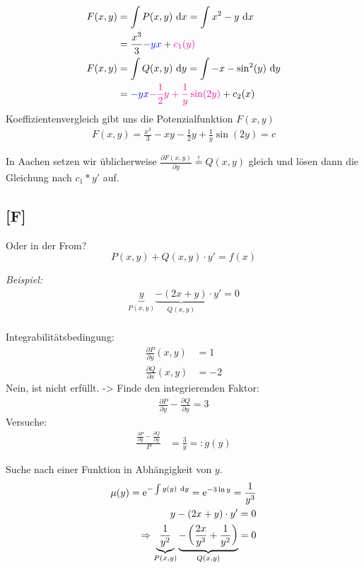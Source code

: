 \documentclass[main.tex]{subfiles}
\begin{document}
\begin{align*}
	F(x,y) &= \int P(x,y) ~\mathrm{d}x = \int x^2 -y ~\mathrm{d}x \\
		&= \frac{x^3}{3} \textcolor{blue}{-y x} + \textcolor{magenta}{c_1(y)} \\
	F(x,y) &= \int Q(x,y) ~\mathrm{d}y = \int -x - \sin^2(y) ~\mathrm{d}y \\
		&= \textcolor{blue}{-y x} \textcolor{magenta}{-\frac{1}{2}y + \frac{1}{y} \sin(2 y)} + c_2(x)\\
\end{align*}
Koeffizientenvergleich gibt uns die Potenzialfunktion $F(x,y)$
\begin{align*}
	F(x,y) = \frac{x^3}{3} -xy -\frac{1}{2}y + \frac{1}{y} \sin(2 y) = c
\end{align*}

In Aachen setzen wir üblicherweise $\frac{\partial F(x,y)}{\partial y} \overset{!}{=} Q(x,y)$ gleich und lösen dann die Gleichung nach $c_1 * y'$ auf.

\subsection{[F]}
\vspace{6cm}
Oder in der From? 
$$
	P(x,y) + Q(x,y)\cdot y' = f(x)
$$

\textit{Beispiel:}
\begin{align*}
	\underbrace{y}_{P(x,y)} \underbrace{- (2x +y)}_{Q(x,y)} \cdot y' = 0 \\
\end{align*}

Integrabilitätsbedingung:
\begin{align*}
	\frac{\partial P}{\partial y}(x,y) &= 1 \\
	\frac{\partial Q}{\partial x}(x,y) &= -2 
\end{align*}
Nein, ist nicht erfüllt. 
-> Finde den integrierenden Faktor:
\begin{align*}
	\frac{\partial P}{\partial y} - \frac{\partial Q}{\partial y} = 3
\end{align*}
Versuche: 
\begin{align*}
	\frac{\frac{\partial P}{\partial y} - \frac{\partial Q}{\partial y}}{P} 
	&= \frac{3}{y} =: g(y)
\end{align*}

Suche nach einer Funktion in Abhängigkeit von $y$. 
\begin{align*}
	\mu(y) = \mathrm{e}^{-\int g(y)~\mathrm{d}y} = \mathrm{e}^{-3\ln y} = \frac{1}{y^3} \\
	y-(2x +y) \cdot y' = 0 \\
	\Rightarrow \underbrace{\frac{1}{y^2}}_{P(x,y)} \underbrace{ -\left(\frac{2x}{y^3} + \frac{1}{y^2} \right)}_{Q(x,y)} = 0
\end{align*}
\end{document}

